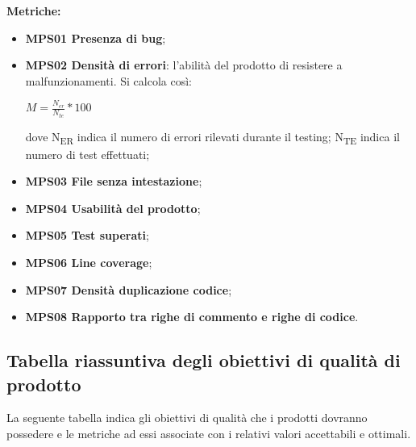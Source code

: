 \documentclass[../piano_di_qualifica.tex]{subfiles}
\begin{document}
\textbf{Metriche:}
\smallbreak
\begin{itemize}
	\item \textbf{MPS01 Presenza di bug};
	\item \textbf{MPS02 Densità di errori}: l'abilità del prodotto di resistere a malfunzionamenti. Si calcola così:
	      \begin{center} $M = \frac{N_{er}}{N_{te}} * 100$ \end{center}
	      dove
	      \subitem N\textsubscript{ER} indica il numero di errori rilevati durante il testing;
	      \subitem N\textsubscript{TE} indica il numero di test effettuati;
	\item \textbf{MPS03 File senza intestazione};
	\item \textbf{MPS04 Usabilità del prodotto};
	\item \textbf{MPS05 Test superati};
	\item \textbf{MPS06 Line coverage};
	\item \textbf{MPS07 Densità duplicazione codice};
	\item \textbf{MPS08 Rapporto tra righe di commento e righe di codice}.
\end{itemize}

\subsection{Tabella riassuntiva degli obiettivi di qualità di prodotto}
La seguente tabella indica gli obiettivi di qualità che i prodotti dovranno possedere e le metriche ad essi associate con i relativi valori accettabili e ottimali.
\end{document}
